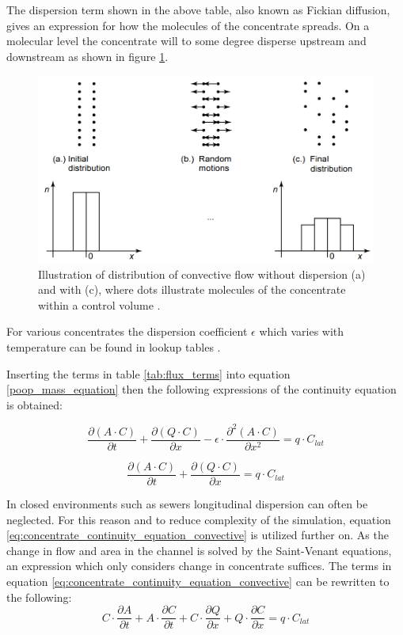 The dispersion term shown in the above table, also known as Fickian diffusion, gives an expression for how the molecules of the concentrate spreads. On a molecular level the concentrate will to some degree disperse upstream and downstream as shown in figure \ref{fig:diffusion_example}. 

\begin{figure}[H]
\centering
\includegraphics[width=.75\textwidth]{report/modeling/pictures/diffusion_example.png}
\caption{Illustration of distribution of convective flow without dispersion (a) and with (c), where dots illustrate molecules of the concentrate within a control volume \cite{karlruhe_con_def_dif_equation}.}
\label{fig:diffusion_example}
\end{figure} 

For various concentrates the dispersion coefficient $\epsilon$ which varies with temperature can be found in lookup tables \cite{karlruhe_con_def_dif_equation}.

Inserting the terms in table \ref{tab:flux_terms} into equation \ref{poop_mass_equation} then the following expressions of the continuity equation is obtained:

\begin{equation}
	\frac{\partial (A\cdot C)}{\partial t} + \frac{\partial (Q \cdot C)}{\partial x} - \epsilon \cdot \frac{\partial^2 (A \cdot C)}{\partial x^2} = q \cdot C_{lat} 
\label{eq:concentrate_continuity_equation_dispersion}
\end{equation}

\begin{equation}
\frac{\partial (A\cdot C)}{\partial t} + \frac{\partial (Q \cdot C)}{\partial x} = q \cdot C_{lat} 
\label{eq:concentrate_continuity_equation_convective}
\end{equation}

In closed environments such as sewers longitudinal dispersion can often be neglected\cite{vestergaard1989numerical}. For this reason and to reduce complexity of the simulation, equation \ref{eq:concentrate_continuity_equation_convective} is utilized further on.
As the change in flow and area in the channel is solved by the Saint-Venant equations, an expression which only considers change in concentrate suffices.
The terms in equation \ref{eq:concentrate_continuity_equation_convective} can be rewritten to the following:
\begin{equation}
	C \cdot \frac{\partial A}{\partial t} + A \cdot \frac{\partial C}{\partial t} + C \cdot \frac{\partial Q}{\partial x} + Q \cdot \frac{\partial C}{\partial x} = q \cdot C_{lat}
\label{eq:poop_trans_deriv1}
\end{equation}

